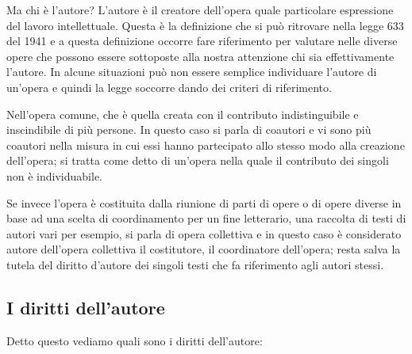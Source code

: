 Ma chi è l'autore? L'autore è il creatore dell'opera quale particolare espressione del lavoro intellettuale. Questa è la definizione che si può ritrovare nella legge 633 del 1941 e a questa definizione occorre fare riferimento per valutare nelle diverse opere che possono essere sottoposte alla nostra attenzione chi sia effettivamente l'autore. In alcune situazioni può non essere semplice individuare l'autore di un'opera e quindi la legge soccorre dando dei criteri di riferimento. 

Nell'opera comune, che è quella creata con il contributo indistinguibile e inscindibile di più persone. In questo caso si parla di coautori e vi sono più coautori nella misura in cui essi hanno partecipato allo stesso modo alla creazione dell'opera; si tratta come detto di un'opera nella quale il contributo dei singoli non è individuabile. 

Se invece l'opera è costituita dalla riunione di parti di opere o di opere diverse in base ad una scelta di coordinamento per un fine letterario, una raccolta di testi di autori vari per esempio, si parla di opera collettiva e in questo caso è considerato autore dell'opera collettiva il costitutore, il coordinatore dell'opera; resta salva la tutela del diritto d'autore dei singoli testi che fa riferimento agli autori stessi. 

\subsection{I diritti dell'autore}

Detto questo vediamo quali sono i diritti dell'autore:

